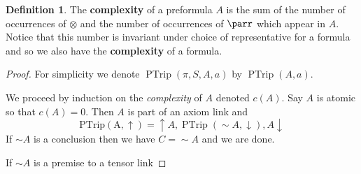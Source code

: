\documentclass[12pt]{article}
\theoremstyle{plain}
\theoremstyle{definition}
\newtheorem{defn}[thm]{Definition} %
\newcommand{\negation}{\sim}
\begin{document}
	\begin{defn}
		The \textbf{complexity} of a preformula $A$ is the sum of the number of occurrences of $\otimes$ and the number of occurrences of $\parr$ which appear in $A$. Notice that this number is invariant under choice of representative for a formula and so we also have the \textbf{complexity} of a formula.
	\end{defn}
	\begin{proof}
		For simplicity we denote $\operatorname{PTrip}(\pi, S, A, a)$ by $\operatorname{PTrip}(A, a)$.
		
		We proceed by induction on the \emph{complexity} of $A$ denoted $c(A)$. Say $A$ is atomic so that $c(A) = 0$. Then $A$ is part of an axiom link and
		\begin{equation}
			\operatorname{PTrip(A,\uparrow)} = \uparrow A, \operatorname{PTrip}(\negation A, \downarrow), A\downarrow
		\end{equation}
		If $\negation A$ is a conclusion then we have $C = \negation A$ and we are done.
		
		If $\negation A$ is a premise to a tensor link
	\end{proof}
	
\end{document}
